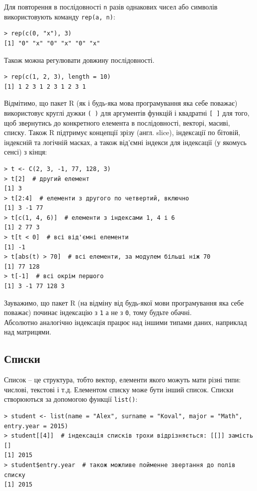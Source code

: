 \documentclass[a4paper, 12pt]{article}
\begin{document}
Для повторення в послідовності \verb|n| разів однакових чисел або символів використовують команду \verb|rep(a, n)|:

\begin{verbatim}
> rep(c(0, "x"), 3)
[1] "0" "x" "0" "x" "0" "x"
\end{verbatim}

Також можна регулювати довжину послідовності.

\begin{verbatim}
> rep(c(1, 2, 3), length = 10)
[1] 1 2 3 1 2 3 1 2 3 1
\end{verbatim}

Відмітимо, що пакет R (як і будь-яка мова програмування яка себе поважає) використовує круглі дужки \verb|( )| для аргументів функцій і квадратні \verb|[ ]| для того, щоб звернутись до конкретного елемента в послідовності, векторі, масиві, списку. Також R підтримує концепції зрізу (англ. slice), індексації по бітовій, індексній та логічній масках, а також від'ємні індекси для індексації (у якомусь сенсі) з кінця:

\begin{verbatim}
> t <- C(2, 3, -1, 77, 128, 3)
> t[2]  # другий елемент
[1] 3
> t[2:4]  # елементи з другого по четвертий, включно
[1] 3 -1 77
> t[c(1, 4, 6)]  # елементи з індексами 1, 4 і 6
[1] 2 77 3
> t[t < 0]  # всі від'ємні елементи
[1] -1
> t[abs(t) > 70]  # всі елементи, за модулем більші ніж 70
[1] 77 128
> t[-1]  # всі окрім першого
[1] 3 -1 77 128 3
\end{verbatim}

Зауважимо, що пакет R (на відміну від будь-якої мови програмування яка себе поважає) починає індексацію з \verb|1| а не з \verb|0|, тому будьте обачні. \\

Абсолютно аналогічно індексація працює над іншими типами даних, наприклад над матрицями.

\subsection{Списки}

Список -- це структура, тобто вектор, елементи якого можуть мати різні типи: числові, текстові і т.д. Елементом списку може бути інший список. Списки створюються за допомогою функції \verb|list()|:
\begin{verbatim}
> student <- list(name = "Alex", surname = "Koval", major = "Math", entry.year = 2015)
> student[[4]]  # індексація списків трохи відрізняється: [[]] замість []
[1] 2015
> student$entry.year  # також можливе пойменне звертання до полів списку
[1] 2015
\end{verbatim}
\end{document}
